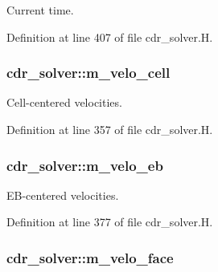 Current time. 



Definition at line 407 of file cdr\+\_\+solver.\+H.

\subsubsection[{\texorpdfstring{m\+\_\+velo\+\_\+cell}{m_velo_cell}}]{ cdr\+\_\+solver\+::m\+\_\+velo\+\_\+cell\hspace{0.3cm}{\ttfamily [protected]}}\hypertarget{classcdr__solver_ac7b5cb0f8b28333fc15fbe0852432c14}{}\label{classcdr__solver_ac7b5cb0f8b28333fc15fbe0852432c14}


Cell-\/centered velocities. 



Definition at line 357 of file cdr\+\_\+solver.\+H.

\subsubsection[{\texorpdfstring{m\+\_\+velo\+\_\+eb}{m_velo_eb}}]{ cdr\+\_\+solver\+::m\+\_\+velo\+\_\+eb\hspace{0.3cm}{\ttfamily [protected]}}\hypertarget{classcdr__solver_a07d7ff94fb77874097df0a169d2f50d5}{}\label{classcdr__solver_a07d7ff94fb77874097df0a169d2f50d5}


E\+B-\/centered velocities. 



Definition at line 377 of file cdr\+\_\+solver.\+H.

\subsubsection[{\texorpdfstring{m\+\_\+velo\+\_\+face}{m_velo_face}}]{ cdr\+\_\+solver\+::m\+\_\+velo\+\_\+face\hspace{0.3cm}{\ttfamily [protected]}}\hypertarget{classcdr__solver_a26f0373df0973d2c6f235c3c221585c4}{}\label{classcdr__solver_a26f0373df0973d2c6f235c3c221585c4}


